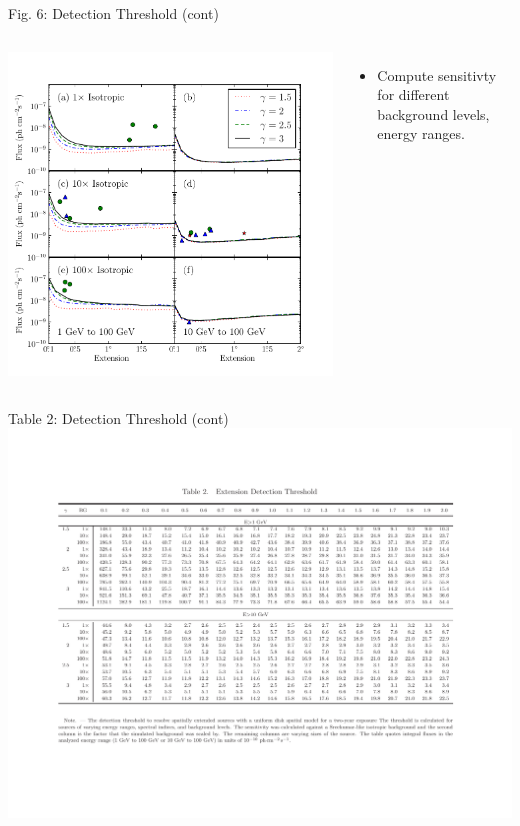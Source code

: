 \documentclass[12pt]{beamer}
\begin{document}
\begin{frame}{Fig. 6: Detection Threshold (cont)}
  \begin{columns}
    \includegraphics[scale=0.5]{plots/all_sensitivity_color.pdf}
    \begin{itemize}
      \item Compute sensitivty for different background levels, energy ranges.
    \end{itemize}
  \end{columns}
\end{frame}

\begin{frame}{Table 2: Detection Threshold (cont)}
  \includegraphics[scale=0.5]{plots/threshold_table.pdf}
\end{frame}
\end{document}
